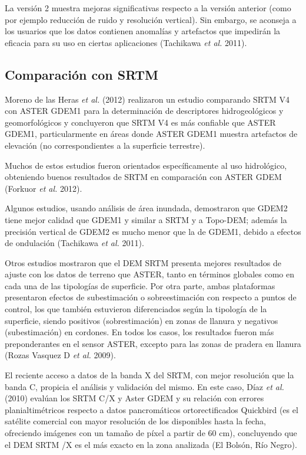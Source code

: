 \documentclass[10pt,a4paper, twoside]{report}
\begin{document}
La versión 2 muestra mejoras significativas respecto a la versión anterior (como por ejemplo reducción de ruido y resolución vertical). Sin embargo, se aconseja a los usuarios que los datos contienen anomalías y artefactos que impedirán la eficacia para su uso en ciertas aplicaciones (Tachikawa \textit{et al.} 2011).

\subsection{Comparación con SRTM}

Moreno de las Heras \textit{et al.} (2012) realizaron un estudio comparando SRTM V4 con ASTER GDEM1 para la determinación de descriptores hidrogeológicos y geomorfológicos y concluyeron que SRTM V4 es más confiable que ASTER GDEM1, particularmente en áreas donde ASTER GDEM1 muestra artefactos de elevación (no correspondientes a la superficie terrestre).

Muchos de estos estudios fueron orientados específicamente al uso hidrológico, obteniendo buenos resultados de SRTM en comparación con ASTER GDEM (Forkuor \textit{et al.} 2012).

Algunos estudios, usando análisis de área inundada, demostraron que GDEM2 tiene mejor calidad que GDEM1 y similar a SRTM y a Topo-DEM; además la precisión vertical de GDEM2 es mucho menor que la de GDEM1, debido a efectos de ondulación (Tachikawa \textit{et al.} 2011).

Otros estudios mostraron que el DEM SRTM presenta mejores resultados de ajuste con los datos de terreno que ASTER, tanto en términos globales como en cada una de las tipologías de superficie. Por otra parte, ambas plataformas presentaron efectos de subestimación o sobreestimación con respecto a puntos de control, los que también estuvieron diferenciados según la tipología de la superficie, siendo positivos (sobrestimación) en zonas de llanura y negativos (subestimación) en cordones. En todos los casos, los resultados fueron más preponderantes en el sensor ASTER, excepto para las zonas de pradera en llanura (Rozas Vasquez D \textit{et al.} 2009).

El reciente acceso a datos de la banda X del SRTM, con mejor resolución que la banda C, propicia el análisis y validación del mismo. En este caso, Díaz \textit{et al.} (2010) evalúan los SRTM C/X y Aster GDEM y su relación con errores planialtimétricos respecto a datos pancromáticos ortorectificados Quickbird (es el satélite comercial con mayor resolución de los disponibles hasta la fecha, ofreciendo imágenes con un tamaño de píxel a partir de 60 cm), concluyendo que el DEM SRTM /X es el más exacto en la zona analizada (El Bolsón, Río Negro). 
\end{document}
